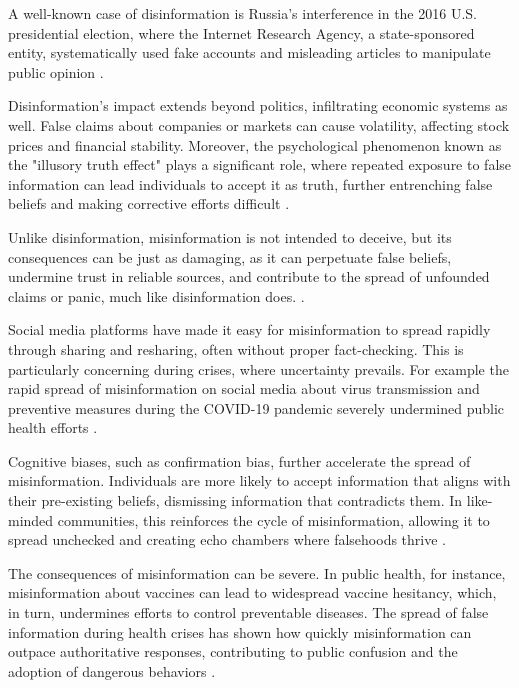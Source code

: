 \documentclass{Configuration_Files/PoliMi3i_thesis}
\begin{document}
A well-known case of disinformation is Russia’s interference in the 2016 U.S. presidential election, where the Internet Research Agency, a state-sponsored entity, systematically used fake accounts and misleading articles to manipulate public opinion \cite{mueller2019report}.

Disinformation’s impact extends beyond politics, infiltrating economic systems as well. False claims about companies or markets can cause volatility, affecting stock prices and financial stability. Moreover, the psychological phenomenon known as the "illusory truth effect" plays a significant role, where repeated exposure to false information can lead individuals to accept it as truth, further entrenching false beliefs and making corrective efforts difficult \cite{brennen2020types}.

Unlike disinformation, misinformation is not intended to deceive, but its consequences can be just as damaging, as it can perpetuate false beliefs, undermine trust in reliable sources, and contribute to the spread of unfounded claims or panic, much like disinformation does. \cite{lewandowsky2017beyond, guess2019}.

Social media platforms have made it easy for misinformation to spread rapidly through sharing and resharing, often without proper fact-checking. This is particularly concerning during crises, where uncertainty prevails. For example the rapid spread of misinformation on social media about virus transmission and preventive measures during the COVID-19 pandemic severely undermined public health efforts \cite{brennen2020types, who2020}.

Cognitive biases, such as confirmation bias, further accelerate the spread of misinformation. Individuals are more likely to accept information that aligns with their pre-existing beliefs, dismissing information that contradicts them. In like-minded communities, this reinforces the cycle of misinformation, allowing it to spread unchecked and creating echo chambers where falsehoods thrive \cite{cinelli2021echo, lazer2018science}.

The consequences of misinformation can be severe. In public health, for instance, misinformation about vaccines can lead to widespread vaccine hesitancy, which, in turn, undermines efforts to control preventable diseases. The spread of false information during health crises has shown how quickly misinformation can outpace authoritative responses, contributing to public confusion and the adoption of dangerous behaviors \cite{bursztyn2020misinformation}.
\end{document}
